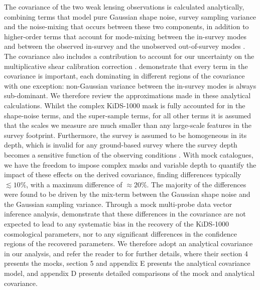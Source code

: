 The covariance of the two weak lensing observations is calculated analytically, combining terms that model pure Gaussian shape noise, survey sampling variance and the noise-mixing that occurs between these two components, in addition to higher-order terms that account for mode-mixing between the in-survey modes and between the observed in-survey and the unobserved out-of-survey modes \citep[known as super-sample covariance,][]{takada/hu:2013}. 
The covariance also includes a contribution to account for our uncertainty on the multiplicative shear calibration correction \citep{kannawadi/etal:2019}. \citet{joachimi/etal:inprep} demonstrate that every term in the covariance is important, each dominating in different regions of the covariance with one exception: non-Gaussian variance between the in-survey modes is always sub-dominant.  We therefore review the approximations made in these analytical calculations.   
Whilst the complex KiDS-1000 mask is fully accounted for in the shape-noise terms, and the super-sample terms, for all other terms it is assumed that the scales we measure are much smaller than any large-scale features in the survey footprint. 
Furthermore, the survey is assumed to be homogeneous in its depth, which is invalid for any ground-based survey where the survey depth becomes a sensitive function of the observing conditions \citep{heydenreich/etal:2020}.   With mock catalogues, we have the freedom to impose complex masks and variable depth to quantify the impact of these effects on the derived covariance, finding differences typically $\lesssim 10\%$, with a maximum difference of $\approx\!20 \%$.  The majority of the differences were found to be driven by the mix-term between the Gaussian shape noise and the Gaussian sampling variance.    Through a mock multi-probe data vector inference analysis, \citet{joachimi/etal:inprep} demonstrate that these differences in the covariance are not expected to lead to any systematic bias in the recovery of the KiDS-1000 cosmological parameters, nor to any significant differences in the confidence regions of the recovered parameters.   We therefore adopt an analytical covariance in our analysis,  and refer the reader to \citet{joachimi/etal:inprep} for further details, where their section 4 presents the mocks, section 5 and appendix E presents the analytical covariance model, and appendix D presents detailed comparisons of the mock and analytical covariance.

